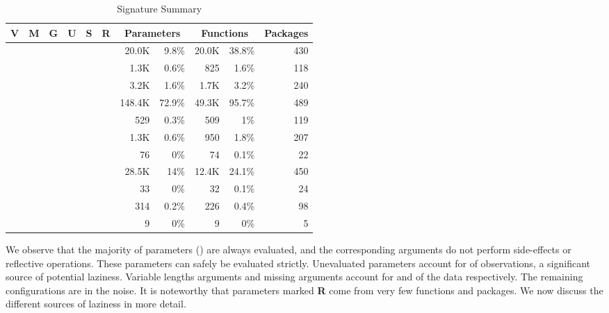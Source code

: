 \documentclass[review,screen,acmsmall]{acmart}
\newcommand{\xmark}{\textcolor{red}{\ding{55}}}
\newcommand{\cmark}{\textcolor{green}{\ding{51}}}
\begin{document}
\begin{table}[!h] \small
  \caption{Signature Summary} \label{table:strictdist} \centering
  \begin{tabular}{ccccccrrrrr}\toprule
    \bf V&\bf M&\bf G&\bf U&\bf S&\bf R&\multicolumn{2}{c}{\textbf{Parameters}} &\multicolumn{2}{c}{\textbf{Functions}}&\bf Packages\\\midrule
    \cmark{}&\xmark{}&\xmark{}&\xmark{}&\xmark{}&\xmark{}&20.0K&9.8\%&20.0K&38.8\%&430\\
    \xmark{}&\cmark{}&\xmark{}&\xmark{}&\xmark{}&\xmark{}&1.3K&0.6\%&825&1.6\%&118\\
    \xmark{}&\xmark{}&\cmark{}&\xmark{}&\xmark{}&\xmark{}&3.2K&1.6\%&1.7K&3.2\%&240\\
    \xmark{}&\xmark{}&\xmark{}&\xmark{}&\xmark{}&\xmark{}&148.4K&72.9\%&49.3K&95.7\%&489\\
    \xmark{}&\xmark{}&\xmark{}&\xmark{}&\xmark{}&\cmark{}&529&0.3\%&509&1\%&119\\
    \xmark{}&\xmark{}&\xmark{}&\xmark{}&\cmark{}&\xmark{}&1.3K&0.6\%&950&1.8\%&207\\
    \xmark{}&\xmark{}&\xmark{}&\xmark{}&\cmark{}&\cmark{}&76&0\%&74&0.1\%&22\\
    \xmark{}&\xmark{}&\xmark{}&\cmark{}&\xmark{}&\xmark{}&28.5K&14\%&12.4K&24.1\%&450\\
    \xmark{}&\xmark{}&\xmark{}&\cmark{}&\xmark{}&\cmark{}&33&0\%&32&0.1\%&24\\
    \xmark{}&\xmark{}&\xmark{}&\cmark{}&\cmark{}&\xmark{}&314&0.2\%&226&0.4\%&98\\
    \xmark{}&\xmark{}&\xmark{}&\cmark{}&\cmark{}&\cmark{}&9&0\%&9&0\%&5\\
    \bottomrule
  \end{tabular}
\end{table}

We observe that the majority of parameters (\TotalStrictParamPerc) are always
evaluated, and the corresponding arguments do not perform side-effects or
reflective operations. These parameters can safely be evaluated strictly.
Unevaluated parameters account for \TotalUnevaluatedParamPerc of observations, a
significant source of potential laziness. Variable lengths arguments and missing
arguments account for \TotalVarargParamPerc and \TotalMissingParamPerc of the
data respectively. The remaining configurations are in the noise. It is
noteworthy that parameters marked \textbf{R} come from very few functions and
packages. We now discuss the different sources of laziness in more detail.
\end{document}
